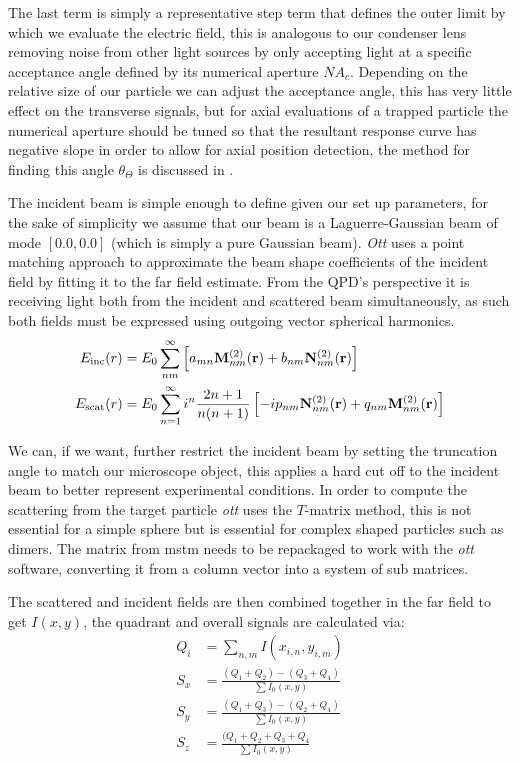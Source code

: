 The last term is simply a representative step term that defines the outer 
limit by which we evaluate the electric field, this is analogous to our 
condenser lens removing noise from other light sources by only accepting 
light at a specific acceptance angle defined by its numerical aperture 
$NA_c$. Depending on the relative size of our particle we can adjust 
the acceptance angle, this has very little effect on the transverse 
signals, but for axial evaluations of a trapped particle the numerical 
aperture should be tuned so that the resultant response curve has negative 
slope in order to allow for axial position detection, the method for 
finding this angle $\theta_\Theta$ is discussed in \cite{Friedrich2012}.

The incident beam is simple enough to define given our set up parameters, 
for the sake of simplicity we assume that our beam is a Laguerre-Gaussian 
beam of mode $[0.0, 0.0]$ (which is simply a pure Gaussian beam). 
\textit{Ott} uses a point matching approach to approximate the beam shape 
coefficients of the incident field by fitting it to the far field estimate. 
From the QPD's perspective it is receiving light both from the incident 
and scattered beam simultaneously, as such both fields must be expressed
using outgoing vector spherical harmonics.
\begin{align}
	E_{\rm inc}(r)&=
	E_0\sum^\infty_{nm}\left[a_{mn}{\bf M}^{(2)}_{nm}({\bf r})+
	b_{nm}{\bf N}^{(2)}_{nm}({\bf r}) \right] 
	\\
	E_{\rm scat}(r)&=E_0 \sum_{n=1}^\infty i^n\frac{2n+1}{n(n+1)}\left[
	-i p_{nm}{\bf N}_{nm}^{(2)}({\bf r})+q_{nm}{\bf M}_{nm}^{(2)}({\bf r})
	\right] 
\end{align}

We can, if we want, further restrict the incident beam by setting 
the truncation angle to match our microscope object, this applies a 
hard cut off to the incident beam to better represent experimental 
conditions. In order to compute the scattering from 
the target particle \textit{ott} uses the $T$-matrix method, this is 
not essential for a simple sphere but is essential for complex shaped 
particles such as dimers. The matrix from mstm needs to be repackaged 
to work with the \textit{ott} software, converting it from a column 
vector into a system of sub matrices. 

The scattered and incident fields are then combined together 
in the far field to get $I(x,y)$, the quadrant and overall signals are 
calculated via:
\begin{align}
	Q_i &= \sum_{n,m} I(x_{i,n}, y_{i,m}) \\
	S_{x} &= \frac{(Q_1+Q_2)-(Q_3+Q_4)}{\sum I_0(x,y)} \\
	S_{y} &= \frac{(Q_1+Q_3)-(Q_2+Q_4)}{\sum I_0(x,y)} \\
	S_{z} &= \frac{(Q_1+Q_2+Q_3+Q_4}{\sum I_0(x,y)}
\end{align}

